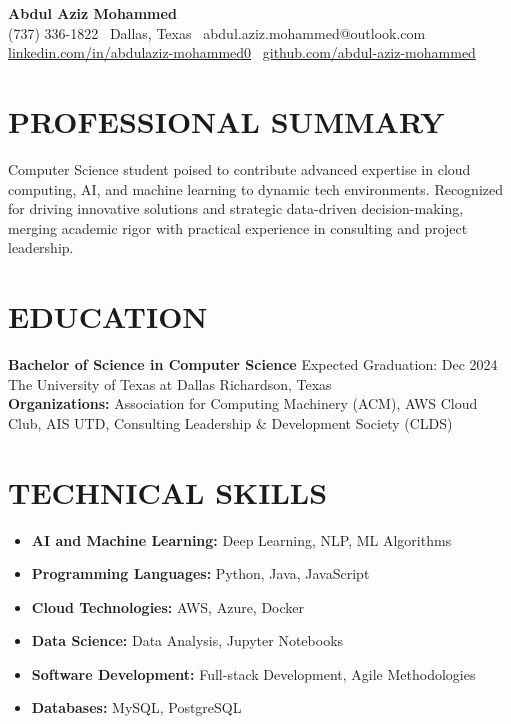 \documentclass[letterpaper,10.9pt]{article}
\begin{document}
	\begin{center}
		\textbf{\huge Abdul Aziz Mohammed}\\
		\smallskip
		(737) 336-1822 \textbar\ Dallas, Texas \textbar\ 
		abdul.aziz.mohammed@outlook.com \\
		\href{https://www.linkedin.com/in/abdulaziz-mohammed0}{linkedin.com/in/abdulaziz-mohammed0} \textbar\ \href{https://github.com/abdul-aziz-mohammed}{github.com/abdul-aziz-mohammed}
	\end{center}
	
	\vspace{-2mm}
	\section*{\textbf{PROFESSIONAL SUMMARY}}
	Computer Science student poised to contribute advanced expertise in cloud computing, AI, and machine learning to dynamic tech environments. Recognized for driving innovative solutions and strategic data-driven decision-making, merging academic rigor with practical experience in consulting and project leadership.
	
	\vspace{-2mm}
	\section*{\textbf{EDUCATION}}
	\textbf{Bachelor of Science in Computer Science} \hfill \textnormal{Expected Graduation: Dec 2024} \\
	The University of Texas at Dallas \hfill \textnormal{Richardson, Texas} \\
	\textbf{Organizations:} Association for Computing Machinery (ACM), AWS Cloud Club, AIS UTD, Consulting Leadership \& Development Society (CLDS)
	
	\vspace{-2mm}
	\section*{\textbf{TECHNICAL SKILLS}}
	\vspace{-3mm}
	\begin{multicols}{2}
		\begin{itemize}
			\item \textbf{AI and Machine Learning:} Deep Learning, NLP, ML Algorithms
			\item \textbf{Programming Languages:} Python, Java, JavaScript
			\item \textbf{Cloud Technologies:} AWS, Azure, Docker
		\end{itemize}
		\columnbreak
		\begin{itemize}
			\item \textbf{Data Science:} Data Analysis, Jupyter Notebooks
			\item \textbf{Software Development:} Full-stack Development, Agile Methodologies
			\item \textbf{Databases:} MySQL, PostgreSQL
		\end{itemize}
	\end{multicols}
		
\end{document}
